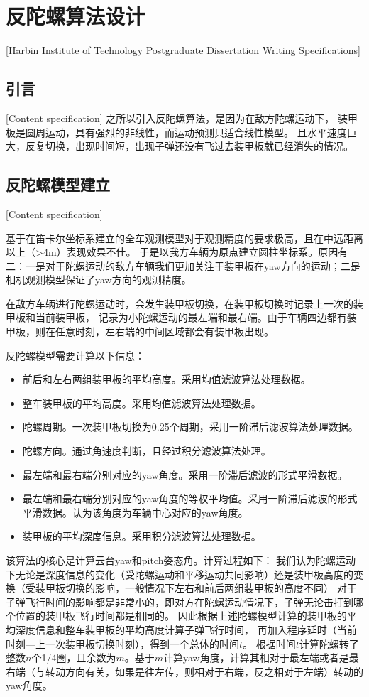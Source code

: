 

\chapter[反陀螺算法设计]{反陀螺算法设计}[Harbin Institute of Technology Postgraduate Dissertation Writing Specifications]

\section{引言}[Content specification]
之所以引入反陀螺算法，是因为在敌方陀螺运动下，
装甲板是圆周运动，具有强烈的非线性，而运动预测只适合线性模型。
且水平速度巨大，反复切换，出现时间短，出现子弹还没有飞过去装甲板就已经消失的情况。


\section{反陀螺模型建立}[Content specification]

基于在笛卡尔坐标系建立的全车观测模型对于观测精度的要求极高，且在中远距离以上（>4m）表现效果不佳。
于是以我方车辆为原点建立圆柱坐标系。原因有二：一是对于陀螺运动的敌方车辆我们更加关注于装甲板在yaw方向的运动；二是相机观测模型保证了yaw方向的观测精度。


在敌方车辆进行陀螺运动时，会发生装甲板切换，在装甲板切换时记录上一次的装甲板和当前装甲板，
记录为小陀螺运动的最左端和最右端。由于车辆四边都有装甲板，则在任意时刻，左右端的中间区域都会有装甲板出现。

反陀螺模型需要计算以下信息：
\begin{itemize}[itemindent=2em]
    \item 前后和左右两组装甲板的平均高度。采用均值滤波算法处理数据。
    \item 整车装甲板的平均高度。采用均值滤波算法处理数据。
    \item 陀螺周期。一次装甲板切换为0.25个周期，采用一阶滞后滤波算法处理数据。
    \item 陀螺方向。通过角速度判断，且经过积分滤波算法处理。
    \item 最左端和最右端分别对应的yaw角度。采用一阶滞后滤波的形式平滑数据。
    \item 最左端和最右端分别对应的yaw角度的等权平均值。采用一阶滞后滤波的形式平滑数据。认为该角度为车辆中心对应的yaw角度。
    \item 装甲板的平均深度信息。采用积分滤波算法处理数据。
\end{itemize}


该算法的核心是计算云台yaw和pitch姿态角。计算过程如下：
我们认为陀螺运动下无论是深度信息的变化（受陀螺运动和平移运动共同影响）还是装甲板高度的变换（受装甲板切换的影响，一般情况下左右和前后两组装甲板的高度不同）
对于子弹飞行时间的影响都是非常小的，即对方在陀螺运动情况下，子弹无论击打到哪个位置的装甲板飞行时间都是相同的。
因此根据上述陀螺模型计算的装甲板的平均深度信息和整车装甲板的平均高度计算子弹飞行时间，
再加入程序延时（当前时刻—上一次装甲板切换时刻），得到一个总体的时间$t$。
根据时间$t$计算陀螺转了整数$n$个1/4圈，且余数为$m$。基于$m$计算yaw角度，计算其相对于最左端或者是最右端（与转动方向有关，如果是往左传，则相对于右端，反之相对于左端）转动的yaw角度。

